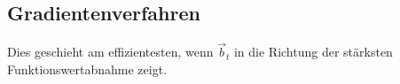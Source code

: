 \subsection{Gradientenverfahren}\label{sec:gradientenverfahren}
Dies geschieht am effizientesten, wenn $\vec{b}_t$ in die Richtung der stärksten Funktionswertabnahme zeigt.

